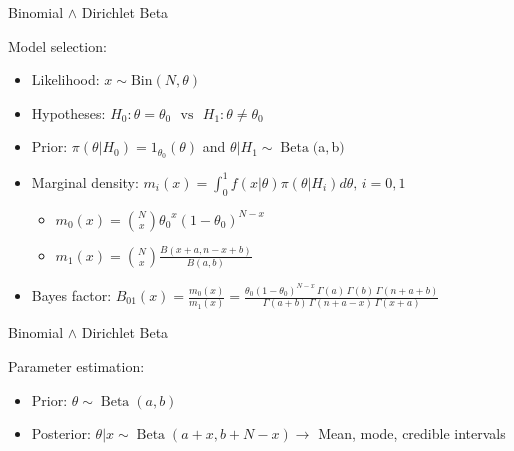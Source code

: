 
\begin{frame}{Binomial $\land$ Dirichlet Beta}

Model selection:

\begin{itemize}

\item Likelihood: $x \sim \text{Bin}(N, \theta)$

\item  Hypotheses: $ H_0: {\theta}={\theta_0} \,\,\,\, \text{vs} \,\,\,\,  H_1: {\theta} \neq \theta_0$

\item Prior: $\pi(\theta|H_0)={1_{\theta_0}(\theta)}$ and $\theta| H_1 \sim \operatorname{Beta}($a$,$b$) $

\item Marginal density: $m_i(x)= \int_0^1 f(x|\theta)\pi(\theta|H_i)d \theta, \,  i=0, 1$

\begin{itemize}

\item $m_0(x)=\binom{N}{x} {\theta_0}^{x}{(1-\theta_0)}^{N-x}$ 

\item  $m_1(x) = \binom{N}{x}\frac{B(x+a, n-x+b)}{B(a,b)}$

\end{itemize}

\item Bayes factor: $B_{01}(x) = \frac{m_0(x)}{m_1(x)}  = \frac{\theta_0(1-\theta_0)^{N-x}\,\Gamma(a)\,\Gamma(b)\,\Gamma(n+a+b)}{\Gamma(a+b)\,\Gamma(n+a-x)\,\Gamma(x+a)}$ 

\end{itemize}

\end{frame}


\begin{frame}{Binomial $\land$ Dirichlet Beta}

Parameter estimation:

\begin{itemize}

\item Prior: $\theta \sim \operatorname{Beta}(a,b) $

\item Posterior: $\theta | x \sim \operatorname{Beta}(a+x, b+N-x ) \rightarrow$ Mean, mode, credible intervals

\end{itemize}

\end{frame}

